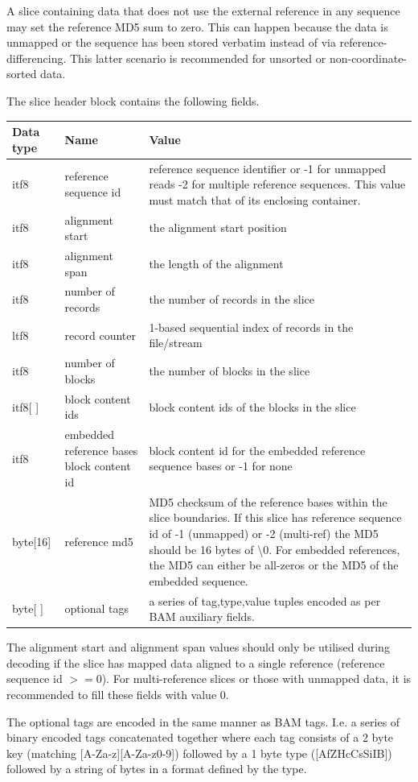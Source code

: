 \documentclass[a4paper]{article}
\begin{document}
A slice containing data that does not use the external reference in
any sequence may set the reference MD5 sum to zero.  This can happen
because the data is unmapped or the sequence has been stored verbatim
instead of via reference-differencing.  This latter scenario is
recommended for unsorted or non-coordinate-sorted data.

The slice header block contains the following fields.

\begin{tabular}{|l|l|>{\raggedright}p{200pt}|}
\hline
\textbf{Data type} & \textbf{Name} & \textbf{Value}\tabularnewline
\hline
itf8 & reference sequence id & reference sequence identifier or\linebreak{}
-1 for unmapped reads\linebreak{}
-2 for multiple reference sequences.\linebreak{}
This value must match that of its enclosing container.\tabularnewline
\hline
itf8 & alignment start & the alignment start position\tabularnewline
\hline
itf8 & alignment span & the length of the alignment\tabularnewline
\hline
itf8 & number of records & the number of records in the slice\tabularnewline
\hline
ltf8 & record counter & 1-based sequential index of records in the file/stream\tabularnewline
\hline
itf8 & number of blocks & the number of blocks in the slice\tabularnewline
\hline
itf8[ ] & block content ids & block content ids of the blocks in the slice\tabularnewline
\hline
itf8 & embedded reference bases block content id & block content id for the embedded 
reference sequence bases or -1 for none\tabularnewline
\hline
byte[16] & reference md5 & MD5 checksum of the reference bases within the slice 
boundaries.  If this slice has reference sequence id of -1 (unmapped) or -2 (multi-ref)
the MD5 should be 16 bytes of \textbackslash{}0. For embedded references, the MD5
can either be all-zeros or the MD5 of the embedded sequence.\tabularnewline
\hline
byte[ ] & optional tags & a series of tag,type,value tuples encoded as
per BAM auxiliary fields.\tabularnewline
\hline
\end{tabular}

The alignment start and alignment span values should only be utilised
during decoding if the slice has mapped data aligned to a single
reference (reference sequence id $>= 0$).  For multi-reference slices
or those with unmapped data, it is recommended to fill these fields
with value 0.

The optional tags are encoded in the same manner as BAM tags.  I.e. a
series of binary encoded tags concatenated together where each tag
consists of a 2 byte key (matching [A-Za-z][A-Za-z0-9]) followed by a
1 byte type ([AfZHcCsSiIB]) followed by a string of bytes in a format
defined by the type.
\end{document}
